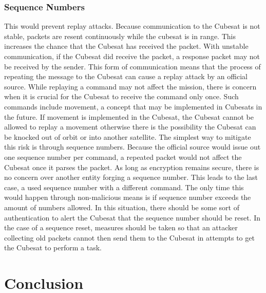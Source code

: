\documentclass[12pt]{article}
\begin{document}
\begin{multicols}{2}
\subsubsection{Sequence Numbers}
This would prevent replay attacks. Because communication to the Cubesat is not stable, packets are resent continuously while the cubesat is in range. This increases the chance that the Cubesat has received the packet. With unstable communication, if the Cubesat did receive the packet, a response packet may not be received by the sender. This form of communication means that the process of repeating the message to the Cubesat can cause a replay attack by an official source. While replaying a command may not affect the mission, there is concern when it is crucial for the Cubesat to receive the command only once. Such commands include movement, a concept that may be implemented in Cubesats in the future. If movement is implemented in the Cubesat, the Cubesat cannot be allowed to replay a movement otherwise there is the possibility the Cubesat can be knocked out of orbit or into another satellite. The simplest way to mitigate this risk is through sequence numbers. Because the official source would issue out one sequence number per command, a repeated packet would not affect the Cubesat once it parses the packet. As long as encryption remains secure, there is no concern over another entity forging a sequence number. This leads to the last case, a used sequence number with a different command. The only time this would happen through non-malicious means is if sequence number exceeds the amount of numbers allowed. In this situation, there should be some sort of authentication to alert the Cubesat that the sequence number should be reset. In the case of a sequence reset, measures should be taken so that an attacker collecting old packets cannot then send them to the Cubesat in attempts to get the Cubesat to perform a task.
\section{Conclusion}
\end{multicols}
\end{document}
